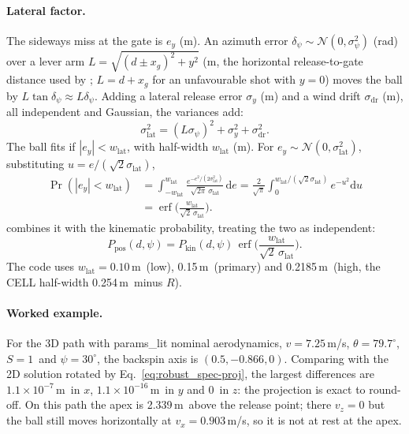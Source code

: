 \paragraph{Lateral factor.}
The sideways miss at the gate is $e_y$ (\unit{m}).
An azimuth error $\delta_\psi\sim\mathcal N(0,\sigma_\psi^2)$ (\unit{rad}) over a lever arm
$L=\sqrt{(d\pm x_g)^2+y^2}$ (\unit{m}, the horizontal release-to-gate distance used by
; $L=d+x_g$ for an unfavourable shot with $y=0$) moves the ball by
$L\tan\delta_\psi\approx L\delta_\psi$.
Adding a lateral release error $\sigma_y$ (\unit{m}) and a wind drift $\sigma_{\mathrm{dr}}$ (\unit{m}),
all independent and Gaussian, the variances add:
\begin{equation}
  \sigma_{\mathrm{lat}}^2 = (L\sigma_\psi)^2 + \sigma_y^2 + \sigma_{\mathrm{dr}}^2 .
  \label{eq:robust_spec-latsig}
\end{equation}
The ball fits if $|e_y|<w_{\mathrm{lat}}$, with half-width $w_{\mathrm{lat}}$ (\unit{m}).
For $e_y\sim\mathcal N(0,\sigma_{\mathrm{lat}}^2)$, substituting $u=e/(\sqrt2\sigma_{\mathrm{lat}})$,
\begin{equation}
  \begin{split}
  \Pr(|e_y|<w_{\mathrm{lat}})
  &= \int_{-w_{\mathrm{lat}}}^{w_{\mathrm{lat}}}\frac{e^{-e^2/(2\sigma_{\mathrm{lat}}^2)}}{\sqrt{2\pi}\,\sigma_{\mathrm{lat}}}\,\mathrm de
  = \frac{2}{\sqrt\pi}\int_0^{w_{\mathrm{lat}}/(\sqrt2\sigma_{\mathrm{lat}})}e^{-u^2}\mathrm du\\
  &= \operatorname{erf}\!\Big(\frac{w_{\mathrm{lat}}}{\sqrt2\,\sigma_{\mathrm{lat}}}\Big).
  \end{split}
  \label{eq:robust_spec-erf}
\end{equation}
 combines it with the kinematic probability, treating the two as independent:
\begin{equation}
  P_{\mathrm{pos}}(d,\psi) = P_{\mathrm{kin}}(d,\psi)\,\operatorname{erf}\!\Big(\frac{w_{\mathrm{lat}}}{\sqrt2\,\sigma_{\mathrm{lat}}}\Big).
  \label{eq:robust_spec-ppos}
\end{equation}
The code uses $w_{\mathrm{lat}} = 0.10$\,\unit{m}\assumed\ (low), 0.15\,\unit{m}\assumed\ (primary) and
0.2185\,\unit{m}\derived\ (high, the CELL half-width 0.254\,\unit{m}\confirmed\ minus $R$).

\paragraph{Worked example.}
For the 3D path with params\_lit nominal aerodynamics, $v=7.25$\,\unit{m/s}\assumed,
$\theta=79.7^\circ$\assumed, $S=1$\assumed\ and $\psi=30^\circ$\assumed, the backspin axis is
$(0.5,-0.866,0)$\derived.
Comparing  with the 2D solution rotated by Eq.~\eqref{eq:robust_spec-proj}, the largest
differences are $1.1\times10^{-7}$\,\unit{m}\predicted\ in $x$, $1.1\times10^{-16}$\,\unit{m}\predicted\ in
$y$ and 0\predicted\ in $z$: the projection is exact to round-off.
On this path the apex is 2.339\,\unit{m}\predicted\ above the release point; there $v_z=0$ but the ball
still moves horizontally at $v_x=0.903$\,\unit{m/s}\predicted, so it is not at rest at the apex.

